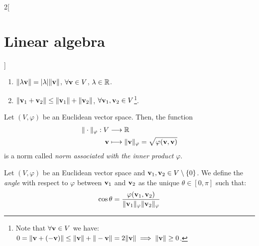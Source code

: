\documentclass[../../../main.tex]{subfiles}
\begin{document}
\begin{multicols}{2}[\section{Linear algebra}]
\begin{definition}
\begin{enumerate}
      \item $\|\lambda \boldsymbol{\mathrm{v}}\|=|\lambda|\|\boldsymbol{\mathrm{v}}\|$, $\forall \boldsymbol{\mathrm{v}}\in V$, $\lambda\in\mathbb{R}$.
      \item $\|\boldsymbol{\mathrm{v}}_1+\boldsymbol{\mathrm{v}}_2\|\leq\|\boldsymbol{\mathrm{v}}_1\|+\|\boldsymbol{\mathrm{v}}_2\|$, $\forall \boldsymbol{\mathrm{v}}_1,\boldsymbol{\mathrm{v}}_2\in V$\footnote{Note that $\forall\boldsymbol{\mathrm{v}}\in V$ we have: $0=\|\boldsymbol{\mathrm{v}}+(-\boldsymbol{\mathrm{v}})\|\leq\|\boldsymbol{\mathrm{v}}\|+\|-\boldsymbol{\mathrm{v}}\|=2\|\boldsymbol{\mathrm{v}}\|\implies\|\boldsymbol{\mathrm{v}}\|\geq 0$.}.
    \end{enumerate}
  \end{definition}
  \begin{prop}
    Let $(V,\varphi)$ be an Euclidean vector space. Then, the function
    \begin{align*}
      \|\cdot\|_\varphi:V & \longrightarrow\mathbb{R}                                                                              \\
      \boldsymbol{\mathrm{v}}  & \longmapsto\|\boldsymbol{\mathrm{v}}\|_\varphi=\sqrt{\varphi(\boldsymbol{\mathrm{v}},\boldsymbol{\mathrm{v}})}
    \end{align*}
    is a norm called \emph{norm associated with the inner product} $\varphi$.
  \end{prop}
  \begin{definition}
    Let $(V,\varphi)$ be an Euclidean vector space and $\boldsymbol{\mathrm{v}}_1,\boldsymbol{\mathrm{v}}_2\in V\setminus\{0\}$. We define the \emph{angle} with respect to $\varphi$ between $\boldsymbol{\mathrm{v}}_1$ and $\boldsymbol{\mathrm{v}}_2$ as the unique $\theta\in[0,\pi]$ such that: $$\cos{\theta}=\frac{\varphi(\boldsymbol{\mathrm{v}}_1,\boldsymbol{\mathrm{v}}_2)}{\|\boldsymbol{\mathrm{v}}_1\|_\varphi\|\boldsymbol{\mathrm{v}}_2\|_\varphi}$$
  \end{definition}

\end{multicols}
\end{document}
